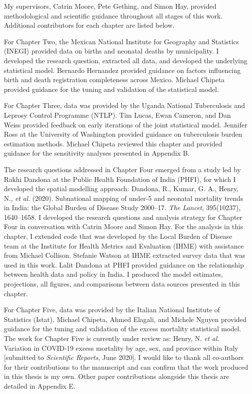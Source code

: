 \documentclass[
]{report}
\begin{document}
\begin{spacing}{1.15}

My supervisors, Catrin Moore, Pete Gething, and Simon Hay, provided methodological and scientific guidance throughout all stages of this work. Additional contributors for each chapter are listed below.

For Chapter Two, the Mexican National Institute for Geography and Statistics (INEGI) provided data on births and neonatal deaths by municipality. I developed the research question, extracted all data, and developed the underlying statistical model. Bernardo Hernandez provided guidance on factors influencing birth and death registration completeness across Mexico. Michael Chipeta provided guidance for the tuning and validation of the statistical model.

For Chapter Three, data was provided by the Uganda National Tuberculosis and Leprosy Control Programme (NTLP). Tim Lucas, Ewan Cameron, and Dan Weiss provided feedback on early iterations of the joint statistical model. Jennifer Ross at the University of Washington provided guidance on tuberculosis burden estimation methods. Michael Chipeta reviewed this chapter and provided guidance for the sensitivity analyses presented in Appendix B.

The research questions addressed in Chapter Four emerged from a study led by Rakhi Dandona at the Public Health Foundation of India (PHFI), for which I developed the spatial modelling approach: Dandona, R., Kumar, G. A., Henry, N., \textit{et al.} (2020). Subnational mapping of under-5 and neonatal mortality trends in India: the Global Burden of Disease Study 2000–17. \textit{The Lancet}, 395(10237), 1640–1658. I developed the research questions and analysis strategy for Chapter Four in conversation with Catrin Moore and Simon Hay. For the analysis in this chapter, I extended code that was developed by the Local Burden of Disease team at the Institute for Health Metrics and Evaluation (IHME) with assistance from Michael Collison. Stefanie Watson at IHME extracted survey data that was used in this work. Lalit Dandona at PHFI provided guidance on the relationship between health data and policy in India. I produced the model estimates, projections, all figures, and comparisons between data sources presented in this chapter.

For Chapter Five, data was provided by the Italian National Institute of Statistics (Istat). Michael Chipeta, Ahmed Elagali, and Michele Nguyen provided guidance for the tuning and validation of the excess mortality statistical model. The work for Chapter Five is currently under review as: Henry, N. \textit{et al.} Variation in COVID-19 excess mortality by age, sex, and province within Italy [submitted to \textit{Scientific Reports}, June 2020]. I would like to thank all co-authors for their contributions to the manuscript and can confirm that the work produced in this thesis is my own. Other paper contributions alongside this thesis are detailed in Appendix E.

\end{spacing}
\end{document}
